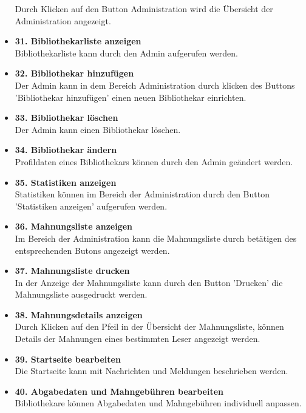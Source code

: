 \documentclass[fontsize=12pt,paper=a4,twoside]{scrartcl}
\begin{document}
\begin{itemize}
	Durch Klicken auf den Button Administration wird die Übersicht der Administration angezeigt. 
	\item \textbf{31. Bibliothekarliste anzeigen}\\
	Bibliothekarliste kann durch den Admin aufgerufen werden. 
	\item \textbf{32. Bibliothekar hinzufügen}\\
	Der Admin kann in dem Bereich Administration durch klicken des Buttons 'Bibliothekar hinzufügen' einen neuen Bibliothekar einrichten. 
	\item \textbf{33. Bibliothekar löschen}\\
	Der Admin kann einen Bibliothekar löschen. 
	\item \textbf{34. Bibliothekar ändern}\\
	Profildaten eines Bibliothekars können durch den Admin geändert werden. 
	\item \textbf{35. Statistiken anzeigen}\\
	Statistiken können im Bereich der Administration durch den Button 'Statistiken anzeigen' aufgerufen werden. 
	\item \textbf{36. Mahnungsliste anzeigen}\\
	Im Bereich der Administration kann die Mahnungsliste durch betätigen des entsprechenden Butons angezeigt werden. 
	\item \textbf{37. Mahnungsliste drucken}\\
	In der Anzeige der Mahnungsliste kann durch den Button 'Drucken' die Mahnungsliste ausgedruckt werden. 
	\item \textbf{38. Mahnungsdetails anzeigen}\\
	Durch Klicken auf den Pfeil in der Übersicht der Mahnungsliste, können Details der Mahnungen eines bestimmten Leser angezeigt werden. 
	\item \textbf{39. Startseite bearbeiten}\\
	Die Startseite kann mit Nachrichten und Meldungen beschrieben werden. 
	\item \textbf{40. Abgabedaten und Mahngebühren bearbeiten}\\
	Bibliothekare können Abgabedaten und Mahngebühren individuell anpassen. 
\end{itemize}
\end{document}
